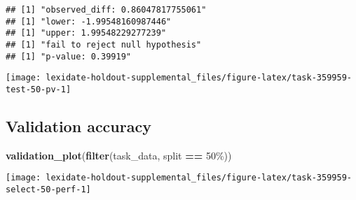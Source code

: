 \documentclass[
]{book}
\newenvironment{Shaded}{\begin{snugshade}}{\end{snugshade}}
\newcommand{\AttributeTok}[1]{\textcolor[rgb]{0.13,0.29,0.53}{#1}}
\newcommand{\DecValTok}[1]{\textcolor[rgb]{0.00,0.00,0.81}{#1}}
\newcommand{\FunctionTok}[1]{\textcolor[rgb]{0.13,0.29,0.53}{\textbf{#1}}}
\newcommand{\NormalTok}[1]{#1}
\newcommand{\OtherTok}[1]{\textcolor[rgb]{0.56,0.35,0.01}{#1}}
\newcommand{\SpecialCharTok}[1]{\textcolor[rgb]{0.81,0.36,0.00}{\textbf{#1}}}
\newcommand{\StringTok}[1]{\textcolor[rgb]{0.31,0.60,0.02}{#1}}
\begin{document}
\begin{Shaded}
\end{Shaded}

\begin{verbatim}
## [1] "observed_diff: 0.86047817755061"
## [1] "lower: -1.99548160987446"
## [1] "upper: 1.99548229277239"
## [1] "fail to reject null hypothesis"
## [1] "p-value: 0.39919"
\end{verbatim}

\texttt{[image: lexidate-holdout-supplemental\_files/figure-latex/task-359959-test-50-pv-1]}

\hypertarget{validation-accuracy-37}{%
\subsection{Validation accuracy}\label{validation-accuracy-37}}

\begin{Shaded}
\begin{Highlighting}[]
\FunctionTok{validation\_plot}\NormalTok{(}\FunctionTok{filter}\NormalTok{(task\_data, split }\SpecialCharTok{==} \StringTok{\textquotesingle{}50\%\textquotesingle{}}\NormalTok{))}
\end{Highlighting}
\end{Shaded}

\texttt{[image: lexidate-holdout-supplemental\_files/figure-latex/task-359959-select-50-perf-1]}
\end{document}
